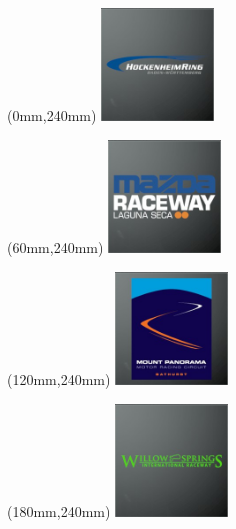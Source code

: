 \begin{textblock*}{30mm}(0mm,240mm)%
\includegraphics[width=30mm]{LG/2015-05-20_00082.png}
\end{textblock*}
\begin{textblock*}{30mm}(60mm,240mm)%
\includegraphics[width=30mm]{LG/2015-05-20_00085.png}
\end{textblock*}
\begin{textblock*}{30mm}(120mm,240mm)%
\includegraphics[width=30mm]{LG/2015-05-20_00087.png}
\end{textblock*}
\begin{textblock*}{30mm}(180mm,240mm)%
\includegraphics[width=30mm]{LG/2015-05-20_00098.png}
\end{textblock*}
